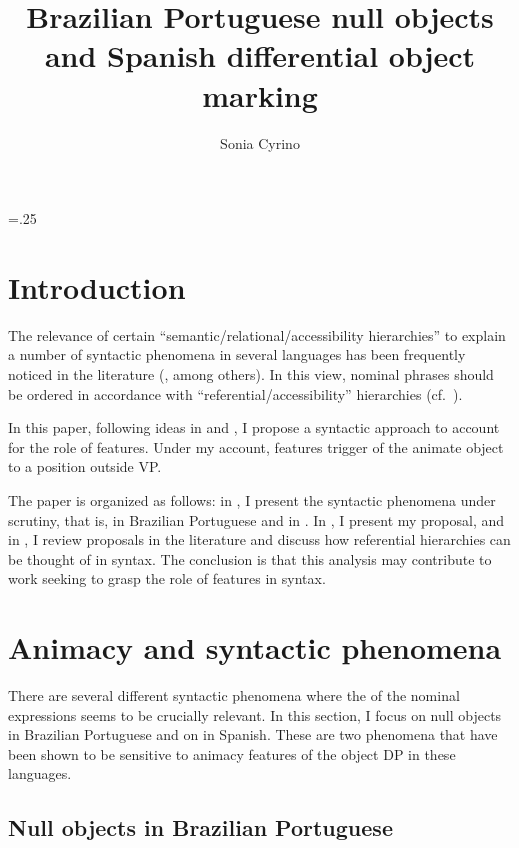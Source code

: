 \documentclass[output=paper]{langsci/langscibook}
\author{Sonia Cyrino\affiliation{University of Campinas}}
\title{Brazilian Portuguese null objects and Spanish differential object marking}
\begin{document}
\glsresetall
\maketitle
\multicolsep=.25\baselineskip

\section{Introduction}

The relevance of certain ``semantic/relational/accessibility hierarchies'' to
explain a number of syntactic phenomena in several languages has been
frequently noticed in the literature (\citealt{Silverstein1976,Aissen2003},
among others). In this view, nominal phrases should be ordered in accordance with
``referential/accessibility'' hierarchies (cf.\ \citealt{Aissen2003}).

In this paper, following ideas in \citet{Carnie2005} and \citet{Merchant2006},
I propose a syntactic approach to account for the role of 
features.  Under my account,  features trigger  of
the animate object to a position outside VP.

The paper is organized as follows: in , I present the
syntactic phenomena under scrutiny, that is,  in Brazilian
Portuguese and  in . In
, I present my proposal, and in , I
review proposals in the literature and discuss how referential hierarchies can
be thought of in syntax.  The conclusion is that this analysis may contribute
to work seeking to grasp the role of  features in syntax.

\section{Animacy and syntactic phenomena}\label{sec:27.2}

There are several different syntactic phenomena where the  of the
nominal expressions seems to be crucially relevant. In this section, I focus on
null objects in Brazilian Portuguese and on  in
Spanish. These are two phenomena that have been shown to be sensitive to
animacy features of the object DP in these languages.

\subsection{Null objects in Brazilian Portuguese}\label{sec:27.2.1}
\end{document}
